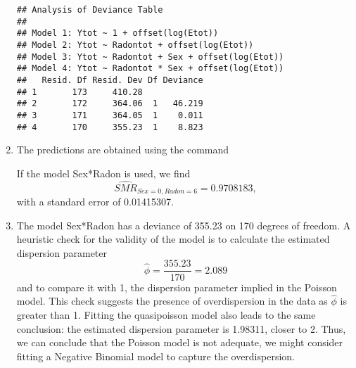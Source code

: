 \begin{solution}{6.6}
\begin{enumerate}
\begin{knitrout}
\color{fgcolor}\begin{kframe}
\begin{alltt}
 \hlkwb{<-} \hlopt{~}\hlopt{+}\hlstd{(}
 \hlkwb{<-} \hlopt{~}\hlopt{+}\hlopt{+}\hlstd{(}
 \hlkwb{<-} \hlopt{~}\hlopt{*}\hlopt{+}\hlstd{(}
\end{alltt}
\begin{verbatim}
## Analysis of Deviance Table
##
## Model 1: Ytot ~ 1 + offset(log(Etot))
## Model 2: Ytot ~ Radontot + offset(log(Etot))
## Model 3: Ytot ~ Radontot + Sex + offset(log(Etot))
## Model 4: Ytot ~ Radontot * Sex + offset(log(Etot))
##   Resid. Df Resid. Dev Df Deviance
## 1       173     410.28
## 2       172     364.06  1   46.219
## 3       171     364.05  1    0.011
## 4       170     355.23  1    8.823
\end{verbatim}
\end{kframe}
\end{knitrout}

\item The predictions are obtained using the command
\begin{knitrout}
\color{fgcolor}\begin{kframe}
\begin{alltt}
\hlstd{(}\hlstd{=}\hlstd{,}\hlstd{=}\hlstd{,}\hlstd{=}\hlstd{),}\hlstd{=}\hlstd{,}\hlstd{=}\hlstd{)}
\end{alltt}
\end{kframe}
\end{knitrout}
 If the model Sex*Radon is used, we find $$\hat{SMR}_{Sex=0,Radon=6}=0.9708183,$$ with a standard error of 0.01415307.

\item The model Sex*Radon has a deviance of 355.23 on 170 degrees of freedom. A heuristic check for the validity of the model is to calculate the estimated dispersion parameter $$\hat{\phi}=\frac{355.23}{170}=2.089$$ and to compare it with 1, the dispersion parameter implied in the Poisson model. This check suggests the presence of overdispersion in the data as $\hat{\phi}$ is greater than 1. Fitting the quasipoisson model also leads to the same conclusion: the estimated dispersion parameter is 1.98311, closer to 2. Thus, we can conclude that the Poisson model is not adequate, we might consider fitting a Negative Binomial model to capture the overdispersion.
\end{enumerate}
\end{solution}
